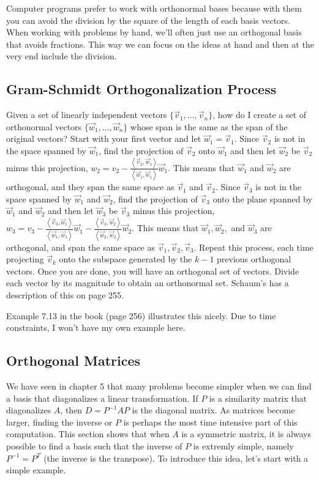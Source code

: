 Computer programs prefer to work with orthonormal bases because with them you can avoid the division by the square of the length of each basis vectors.  When working with problems by hand, we'll often just use an orthogonal basis that avoids fractions.  This way we can focus on the ideas at hand and then at the very end include the division.

\subsection{Gram-Schmidt Orthogonalization Process}


Given a set of linearly independent vectors $\{\vec v_1,\ldots,\vec v_n\}$, how do I create a set of orthonormal vectors $\{\vec w_1,\ldots,\vec w_n\}$ whose span is the same as the span of the original vectors?  Start with your first vector and let $\vec w_1 = \vec v_1$.  Since $\vec v_2$ is not in the space spanned by $\vec w_1$, find the projection of $\vec v_2$ onto $\vec w_1$ and then let $\vec w_2$ be $\vec v_2$ minus this projection, $w_2 = v_2 - \frac{\left<\vec v_2,\vec w_1\right>}{\left<\vec w_1,\vec w_1\right>}\vec w_1.$ This means that $\vec w_1$ and $\vec w_2$ are orthogonal, and they span the same space as $\vec v_1$ and $\vec v_2$.  Since $\vec v_3$ is not in the space spanned by $\vec w_1$ and $\vec w_2$, find the projection of $\vec v_3$ onto the plane spanned by $\vec w_1$ and $\vec w_2$ and then let $\vec w_3$ be $\vec v_3$ minus this projection, 
$w_3 = v_3 
- \frac{\left<\vec v_3,\vec w_1\right>}{\left<\vec w_1,\vec w_1\right>}\vec w_1
- \frac{\left<\vec v_3,\vec w_2\right>}{\left<\vec w_2,\vec w_2\right>}\vec w_2.$ This means that $\vec w_1, \vec w_2,$ and $\vec w_3$ are orthogonal, and span the same space as $\vec v_1, \vec v_2, \vec v_3$.  Repeat this process, each time projecting $\vec v_k$ onto the subspace generated by the $k-1$ previous orthogonal vectors.  Once you are done, you will have an orthogonal set of vectors.  Divide each vector by its magnitude to obtain an orthonormal set.  Schaum's has a description of this on page 255.


\begin{example}
Example 7.13 in the book (page 256) illustrates this nicely. Due to time constraints, I won't have my own example here.
\end{example}


\subsection{Orthogonal Matrices}
We have seen in chapter 5 that many problems become simpler when we can find a basis that diagonalizes a linear transformation. If $P$ is a similarity matrix that diagonalizes $A$, then $D=P^{-1}AP$ is the diagonal matrix.  As matrices become larger, finding the inverse or $P$ is perhaps the most time intensive part of this computation.  This section shows that when $A$ is a symmetric matrix, it is always possible to find a basis such that the inverse of $P$ is extremly simple, namely $P^{-1} = P^T$ (the inverse is the transpose). To introduce this idea, let's start with a simple example.

